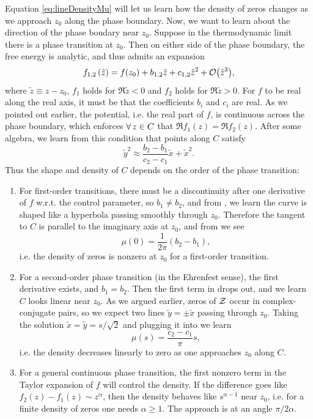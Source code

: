 Equation \eqref{eq:lineDensityMu} will let us learn how the density of zeros
changes as we approach $z_0$ along the phase boundary. Now, we want to learn
about the direction of the phase boudary near $z_0$. Suppose in the
thermodynamic limit there is a phase transition at $z_0$. Then on either side of
the phase boundary, the free energy is analytic, and thus admits an expansion
\begin{equation}
f_{1,2}\left(\tilde{z}\right)=f(z_0)+b_{1,2}\tilde{z}+c_{1,2}\tilde{z}^2+\order{\tilde{z}^3},
\end{equation}
where $\tilde{z}\equiv z-z_0$, $f_1$ holds for $\Re\tilde{z}<0$ and $f_2$ holds
for $\Re\tilde{z}>0$. For $f$ to be real along the real axis, it must be that
the coefficients $b_i$ and $c_i$ are real. As we pointed out earlier, the
potential, i.e. the real part of $f$, is continuous across the phase boundary,
which enforces $\operatorname{\forall} z\in C$ that $\Re f_1(z)=\Re f_2(z)$. After some
algebra, we learn from this condition that points along $C$ satisfy
\begin{equation}\label{eq:zerosLine}
\tilde{y}^2\approx\frac{b_2-b_1}{c_2-c_1}\tilde{x}+\tilde{x}^2.
\end{equation}
Thus the shape and density of $C$ depends on the order of the phase transition: 
\begin{enumerate}
\item For first-order transitions, there must be a discontinuity after one
derivative of $f$ w.r.t. the control parameter, so $b_1\neq b_2$,
and from , we learn the curve
is shaped like a hyperbola passing smoothly through $z_0$. Therefore the tangent
to $C$ is parallel to the imaginary axis at $z_0$, and from
 we see
$$
\mu(0)=\frac{1}{2\pi}(b_2-b_1),
$$ 
i.e. the density of zeros is nonzero at $z_0$ for a first-order transition.
\item For a second-order phase transition (in the Ehrenfest sense), 
the first derivative exists, and
$b_1=b_2$. Then the first term in  drops out, and we
learn $C$ looks linear near $z_0$. As we argued earlier, zeros of $\mathcal{Z}$
occur in complex-conjugate pairs, so we expect two lines
$\tilde{y}=\pm\tilde{x}$ passing through $z_0$. Taking the solution
$\tilde{x}=\tilde{y}=s/\sqrt{2}$ and plugging it into
 we learn
$$
\mu(s)=\frac{c_2-c_1}{\pi}s,
$$
i.e. the density decreases linearly to zero as one approaches $z_0$ along $C$.
\item For a general continuous phase transition, the first nonzero term in the
Taylor expansion of $f$ will control the density. If the difference 
goes like $f_2(z)-f_1(z)\sim z^\alpha$, then the density behaves like 
$s^{\alpha-1}$ near $z_0$, i.e. for a finite density of zeros one 
needs $\alpha\geq 1$. The approach is at an angle $\pi/2\alpha$.
\end{enumerate}


